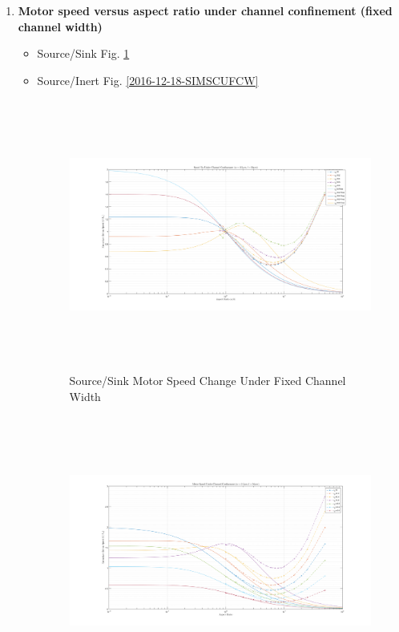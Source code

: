 \documentclass[fontsize=11pt, %
                             paper=a4, %
                             twoside, %
                             captions=tableheading,
                             index=totoc,
                             hyperref]{labbook}
\begin{document}
\begin{enumerate}
\begin{itemize}
\begin{figure}
\end{figure}
\end{itemize}
\item \textbf{Motor speed versus aspect ratio under channel confinement (fixed channel width)}\\
\begin{itemize}
\item Source/Sink Fig. \ref{2016-12-25-SSMSCUFCW}
\item Source/Inert Fig. \ref{2016-12-18-SIMSCUFCW}
\begin{figure}
\centering
\includegraphics[width=\linewidth, height=3.5in]{2016-12-25-Ratio_SourceSink_Channel.png}
\caption{Source/Sink Motor Speed Change Under Fixed Channel Width}\label{2016-12-25-SSMSCUFCW}
\end{figure}
\begin{figure}
\centering
\includegraphics[width=\linewidth, height=3.5in]{2016-12-18-Ratio_SourceInert_Channel.png}

\end{figure}
\end{itemize}
\end{enumerate}
\end{document}
